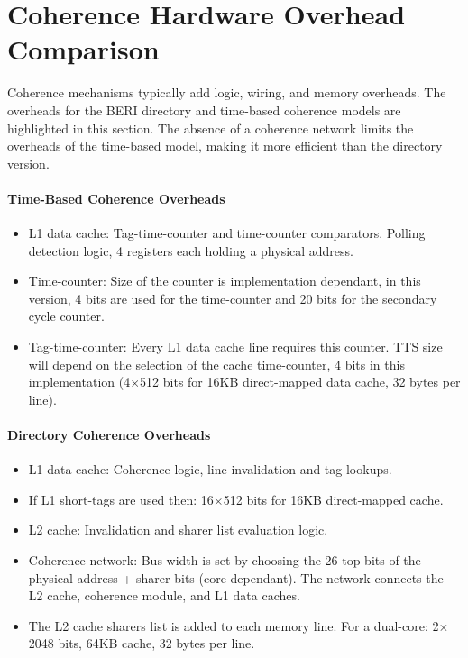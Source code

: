 \clearpage
\section{Coherence Hardware Overhead Comparison}
	\label{section_fpga_overheads}
	Coherence mechanisms typically add logic, wiring, and memory overheads. The overheads for the BERI directory and time-based coherence models are highlighted in this section. The absence of a coherence network limits the overheads of the time-based model, making it more efficient than the directory version.

	\paragraph{Time-Based Coherence Overheads}
	\begin{itemize}
	\item L1 data cache: Tag-time-counter and time-counter comparators. Polling detection logic, 4 registers each holding a physical address.
	\item Time-counter: Size of the counter is implementation dependant, in this version, 4 bits are used for the time-counter and 20 bits for the secondary cycle counter.
	\item Tag-time-counter: Every L1 data cache line requires this counter. TTS size will depend on the selection of the cache time-counter, 4 bits in this implementation (4$\times$512 bits for 16KB direct-mapped data cache, 32 bytes per line).
	\end{itemize}
	
	\paragraph{Directory Coherence Overheads}
	\begin{itemize}
	\item L1 data cache: Coherence logic, line invalidation and tag lookups.
	\item If L1 short-tags are used then: 16$\times$512 bits for 16KB direct-mapped cache.
	\item L2 cache: Invalidation and sharer list evaluation logic.
	\item Coherence network: Bus width is set by choosing the 26 top bits of the physical address + sharer bits (core dependant). The network connects the L2 cache, coherence module, and L1 data caches.
	\item The L2 cache sharers list is added to each memory line. For a dual-core: 2$\times$2048 bits, 64KB cache, 32 bytes per line.
	\end{itemize}
	
